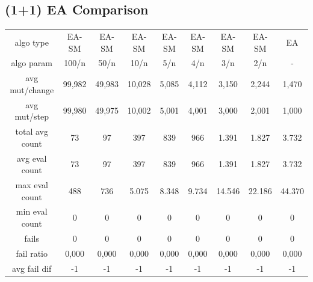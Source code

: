 \subsection{(1+1) EA Comparison}
\begin{tabular}[h]{ccccccccc}
algo type&         EA-SM&  EA-SM&  EA-SM&  EA-SM&  EA-SM&  EA-SM&  EA-SM&     EA\\
algo param&        100/n&   50/n&   10/n&    5/n&    4/n&    3/n&    2/n&      -\\
avg mut/change&   99,982& 49,983& 10,028&  5,085&  4,112&  3,150&  2,244&  1,470\\
avg mut/step&     99,980& 49,975& 10,002&  5,001&  4,001&  3,000&  2,001&  1,000\\
\hline
total avg count&      73&     97&    397&    839&    966&  1.391&  1.827&  3.732\\
avg eval count&       73&     97&    397&    839&    966&  1.391&  1.827&  3.732\\
max eval count&      488&    736&  5.075&  8.348&  9.734& 14.546& 22.186& 44.370\\
min eval count&        0&      0&      0&      0&      0&      0&      0&      0\\
\hline
fails&                 0&      0&      0&      0&      0&      0&      0&      0\\
fail ratio&        0,000&  0,000&  0,000&  0,000&  0,000&  0,000&  0,000&  0,000\\
avg fail dif&         -1&     -1&     -1&     -1&     -1&     -1&     -1&     -1\\
\end{tabular}
